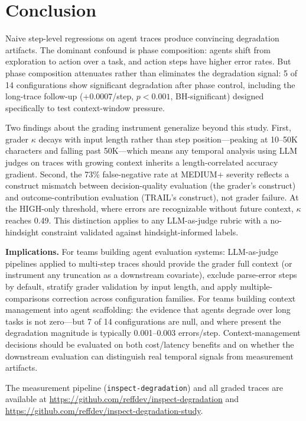 \documentclass[11pt]{article}
\begin{document}
\section{Conclusion}

Naive step-level regressions on agent traces produce convincing degradation artifacts.
The dominant confound is phase composition: agents shift from exploration to action over a task, and action steps have higher error rates.
But phase composition attenuates rather than eliminates the degradation signal: 5 of 14 configurations show significant degradation after phase control, including the long-trace follow-up ($+0.0007$/step, $p < 0.001$, BH-significant) designed specifically to test context-window pressure.

Two findings about the grading instrument generalize beyond this study.
First, grader $\kappa$ decays with input length rather than step position---peaking at 10--50K characters and falling past 50K---which means any temporal analysis using LLM judges on traces with growing context inherits a length-correlated accuracy gradient.
Second, the 73\% false-negative rate at MEDIUM+ severity reflects a construct mismatch between decision-quality evaluation (the grader's construct) and outcome-contribution evaluation (TRAIL's construct), not grader failure.
At the HIGH-only threshold, where errors are recognizable without future context, $\kappa$ reaches 0.49.
This distinction applies to any LLM-as-judge rubric with a no-hindsight constraint validated against hindsight-informed labels.

\textbf{Implications.}
For teams building agent evaluation systems: LLM-as-judge pipelines applied to multi-step traces should provide the grader full context (or instrument any truncation as a downstream covariate), exclude parse-error steps by default, stratify grader validation by input length, and apply multiple-comparisons correction across configuration families.
For teams building context management into agent scaffolding: the evidence that agents degrade over long tasks is not zero---but 7 of 14 configurations are null, and where present the degradation magnitude is typically 0.001--0.003 errors/step.
Context-management decisions should be evaluated on both cost/latency benefits and on whether the downstream evaluation can distinguish real temporal signals from measurement artifacts.

The measurement pipeline (\texttt{inspect-degradation}) and all graded traces are available at \url{https://github.com/reffdev/inspect-degradation} and \url{https://github.com/reffdev/inspect-degradation-study}.
\end{document}
